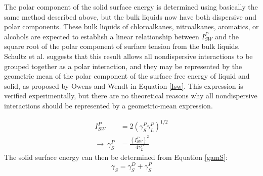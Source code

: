 
The polar component of the solid surface energy is determined using basically the same method described above,\cite{Schultz1977} but the bulk liquids now have both dispersive and polar components. These bulk liquids of chloroalkanes, nitroalkanes, aromatics, or alcohols are expected to establish a linear relationship between $I_{SW}^{P} $ and the square root of the polar component of surface tension from the bulk liquids. Schultz et al. suggests that this result allows all nondispersive interactions to be grouped together as a polar interaction, and they may be represented by the geometric mean of the polar component of the surface free energy of liquid and solid, as proposed by Owens and Wendt in Equation \ref{Isw}. This expression is verified experimentally, but there are no theoretical reasons why all nondispersive interactions should be represented by a geometric-mean expression.\cite{Fowkes1964}

\begin{equation}
\label{Isw}
	\begin{split}
	I_{SW}^{P} 							& = 2 (\gamma_{S}^{P}\gamma_{L}^{P})^{1/2} \\
	\rightarrow ~ \gamma_{S}^{P}	& = \frac{(I_{SW}^{P})^{2} }{4\gamma_{L}^{P}} 
	\end{split}
\end{equation}
The solid surface energy can then be determined from Equation \ref{gamS}:
\begin{equation}
\label{gamS}	\gamma_{S} = \gamma_{S}^{D} + \gamma_{S}^{P}	
\end{equation}

